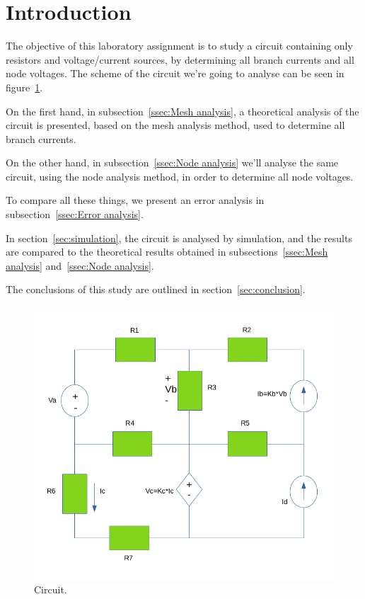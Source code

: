 \section{Introduction}
\label{sec:introduction}

\par The objective of this laboratory assignment is to study a circuit containing only resistors and voltage/current sources, by determining all branch currents and all node voltages.
The scheme of the circuit we're going to analyse can be seen in figure~\ref{fig:Cir}.
\par \noindent On the first hand, in subsection~\ref{ssec:Mesh analysis}, a theoretical analysis of the circuit is
presented, based on the mesh analysis method, used to determine all branch currents. 
\par \noindent On the other hand, in subsection~\ref{ssec:Node analysis} we'll analyse the same circuit, using the node analysis method, in order to determine all node voltages.
\par \noindent To compare all these things, we present an error analysis in subsection~\ref{ssec:Error analysis}.
\par \noindent In section~\ref{sec:simulation}, the circuit is analysed by simulation, and the results are compared to the theoretical results obtained in
subsections~\ref{ssec:Mesh analysis} and~\ref{ssec:Node analysis}. 
\par \noindent The conclusions of this study are outlined in section~\ref{sec:conclusion}.

\begin{figure}[H] \centering
\includegraphics[width=0.8\linewidth]{Esquema_intro.png}
\caption{Circuit.}
\label{fig:Cir}
\end{figure}

